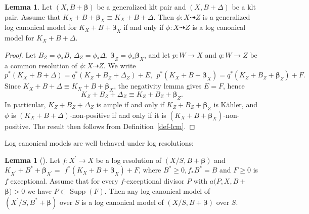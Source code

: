 \documentclass[11pt]{amsart}
\numberwithin{equation}{section}
\def\bbeta{\boldsymbol{\beta}}
\theoremstyle{definition}
\theoremstyle{definition}
\newtheorem{lemma}[theorem]{Lemma}
\theoremstyle{definition}
\begin{document}
\begin{lemma}
Let $(X, B + \bbeta)$ be a generalized klt pair and $(X, B + \Delta)$ be a klt pair. Assume that $K_X + B + \bbeta_X \equiv K_X + B + \Delta$. Then $\phi : X \dasharrow Z$ is a generalized log canonical model for $K_X + B + \bbeta_X$ if and only if $\phi:X\dasharrow Z$ is a log canonical model for $K_X + B + \Delta$.
\end{lemma}
\begin{proof}
Let $B_Z = \phi_* B$, $\Delta_Z = \phi_*\Delta$, $\bbeta_Z = \phi_*\bbeta_X$, and let $p: W \to X$ and $q: W \to Z$ be a common resolution of $\phi: X \dasharrow Z$. We write
$$p^*(K_{X}+ B + \Delta) = q^*(K_Z+B_Z+\Delta_Z)+E, \ \ p^*(K_{X}+ B + \bbeta_X) = q^*(K_Z+B_Z+\bbeta_Z)+F.$$
Since $K_X+B+\Delta \equiv K_X+B+\bbeta_X$, the negativity lemma \cite[Lemma 2.8]{DH24} gives $E = F$, hence
$$K_Z+B_Z+\Delta_Z \equiv K_Z+B_Z+\bbeta_Z.$$
In particular, $K_Z+B_Z+\Delta_Z$ is ample if and only if $K_Z+B_Z+\bbeta_Z$ is K\"ahler, and $\phi$ is $(K_X+B+\Delta)$-non-positive if and only if it is $(K_X+B+\bbeta_X)$-non-positive. The result then follows from Definition~\ref{def-lcm}.
\end{proof}

Log canonical models are well behaved under log resolutions:
\begin{lemma}[{\cite[Lemma 2.12]{DHY23}}]
Let $f: X^{\prime} \rightarrow X$ be a log resolution of $(X / S, B+\boldsymbol{\beta})$ and $K_{X^{\prime}}+B^*+\boldsymbol{\beta}_{X^{\prime}}=$ $f^*\left(K_X+B+\boldsymbol{\beta}_X\right)+F$, where $B^* \geq 0, f_* B^*=B$ and $F \geq 0$ is $f$ exceptional. Assume that for every $f$-exceptional divisor $P$ with $a(P, X, B+$ $\boldsymbol{\beta})>0$ we have $P \subset \operatorname{Supp}(F)$. Then any log canonical model of $\left(X^{\prime} / S, B^*+\boldsymbol{\beta}\right)$ over $S$ is a log canonical model of $(X / S, B+\boldsymbol{\beta})$ over $S$.
\end{lemma}



\end{document}
